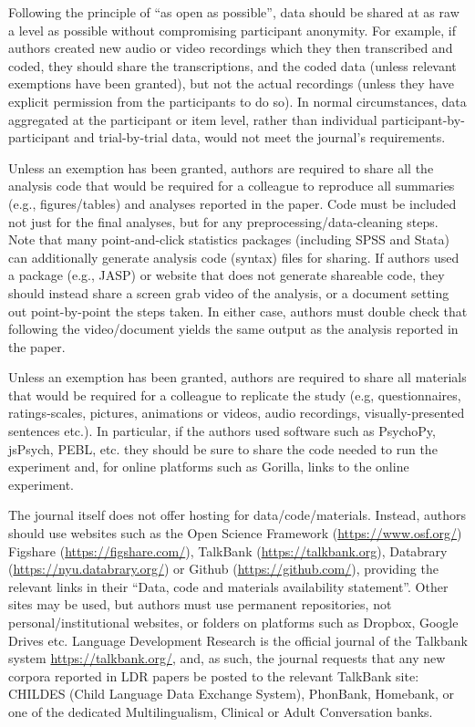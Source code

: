 \documentclass{ldr-article}
\begin{document}
Following the principle of “as open as possible”, data should be shared at as raw a level as possible without compromising participant anonymity. For example, if authors created new audio or video recordings which they then transcribed and coded, they should share the transcriptions, and the coded data (unless relevant exemptions have been granted), but not the actual recordings (unless they have explicit permission from the participants to do so). In normal circumstances, data aggregated at the participant or item level, rather than individual participant-by-participant and trial-by-trial data, would not meet the journal’s requirements. 

Unless an exemption has been granted, authors are required to share all the analysis code that would be required for a colleague to reproduce all summaries (e.g., figures/tables) and analyses reported in the paper. Code must be included not just for the final analyses, but for any preprocessing/data-cleaning steps. Note that many point-and-click statistics packages (including SPSS and Stata) can additionally generate analysis code (syntax) files for sharing. If authors used a package (e.g., JASP) or website that does not generate shareable code, they should instead share a screen grab video of the analysis, or a document setting out point-by-point the steps taken. In either case, authors must double check that following the video/document yields the same output as the analysis reported in the paper.

Unless an exemption has been granted, authors are required to share all materials that would be required for a colleague to replicate the study (e.g, questionnaires, ratings-scales, pictures, animations or videos, audio recordings, visually-presented sentences etc.). In particular, if the authors used software such as PsychoPy, jsPsych, PEBL, etc. they should be sure to share the code needed to run the experiment and, for online platforms such as Gorilla, links to the online experiment.

The journal itself does not offer hosting for data/code/materials. Instead, authors should use websites such as the Open Science Framework (\url{https://www.osf.org/}) Figshare (\url{https://figshare.com/}), TalkBank (\url{https://talkbank.org}), Databrary (\url{https://nyu.databrary.org/}) or Github (\url{https://github.com/}), providing the relevant links in their “Data, code and materials availability statement”. Other sites may be used, but authors must use permanent repositories, not personal/institutional websites, or folders on platforms such as Dropbox, Google Drives etc. Language Development Research is the official journal of the Talkbank system \url{https://talkbank.org/}, and, as such, the journal requests that any new corpora reported in LDR papers be posted to the relevant TalkBank site: CHILDES (Child Language Data Exchange System), PhonBank, Homebank, or one of the dedicated Multilingualism, Clinical or Adult Conversation banks.
\end{document}
